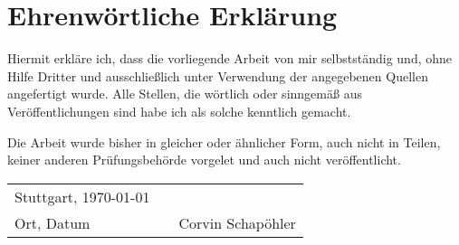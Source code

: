 \chapter*{Ehrenwörtliche Erklärung}
\thispagestyle{empty}
Hiermit erkläre ich, dass die vorliegende Arbeit von mir selbstständig und, ohne Hilfe Dritter und ausschließlich unter Verwendung der angegebenen Quellen angefertigt wurde. Alle Stellen, die wörtlich oder sinngemäß aus Veröffentlichungen sind habe ich als solche kenntlich gemacht.

Die Arbeit wurde bisher in gleicher oder ähnlicher Form, auch nicht in Teilen, keiner anderen Prüfungsbehörde vorgelet und auch nicht veröffentlicht.
\vspace{2cm}

\begin{center}
	\begin{tabular}[h]{lp{2cm}p{5.5cm}}
		Stuttgart, \today & & \\
		\cline{1-1}\cline{3-3}
		Ort, Datum& & Corvin Schapöhler\\
	\end{tabular}
\end{center}

